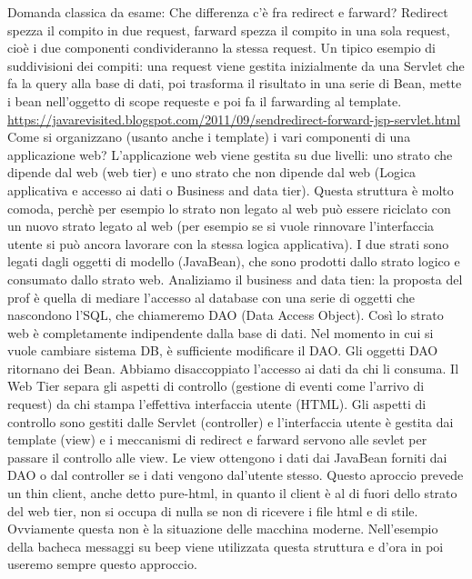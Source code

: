 Domanda classica da esame: Che differenza c'è fra redirect e farward? Redirect spezza il compito in due request, farward spezza il compito in una sola request, cioè i due componenti condivideranno la stessa request.\newline
Un tipico esempio di suddivisioni dei compiti: una request viene gestita inizialmente da una Servlet che fa la query alla base di dati, poi trasforma il risultato in una serie di Bean, mette i bean nell'oggetto di scope requeste e poi fa il farwarding al template. \newline
\url{https://javarevisited.blogspot.com/2011/09/sendredirect-forward-jsp-servlet.html}\newline
\newline
Come si organizzano (usanto anche i template) i vari componenti di una applicazione web?\newline
L'applicazione web viene gestita su due livelli: uno strato che dipende dal web (web tier) e uno strato che non dipende dal web (Logica applicativa e accesso ai dati o Business and data tier). \newline
Questa struttura è molto comoda, perchè per esempio lo strato non legato al web può essere riciclato con un nuovo strato legato al web (per esempio se si vuole rinnovare l'interfaccia utente si può ancora lavorare con la stessa logica applicativa).\newline
I due strati sono legati dagli oggetti di modello (JavaBean), che sono prodotti dallo strato logico e consumato dallo strato web.\newline
Analiziamo il business and data tien: la proposta del prof è quella di mediare l'accesso al database con una serie di oggetti che nascondono l'SQL, che chiameremo DAO (Data Access Object). Così lo strato web è completamente indipendente dalla base di dati. Nel momento in cui si vuole cambiare sistema DB, è sufficiente modificare il DAO. Gli oggetti DAO ritornano dei Bean. Abbiamo disaccoppiato l'accesso ai dati da chi li consuma.\newline
Il Web Tier separa gli aspetti di controllo (gestione di eventi come l'arrivo di request) da chi stampa l'effettiva interfaccia utente (HTML). Gli aspetti di controllo sono gestiti dalle Servlet (controller) e l'interfaccia utente è gestita dai template (view) e i meccanismi di redirect e farward servono alle sevlet per passare il controllo alle view. Le view ottengono i dati dai JavaBean forniti dai DAO o dal controller se i dati vengono dal'utente stesso.\newline
Questo aproccio prevede un thin client, anche detto pure-html, in quanto il client è al di fuori dello strato del web tier, non si occupa di nulla se non di ricevere i file html e di stile. Ovviamente questa non è la situazione delle macchina moderne.
\newline
Nell'esempio della bacheca messaggi su beep viene utilizzata questa struttura e d'ora in poi useremo sempre questo approccio.